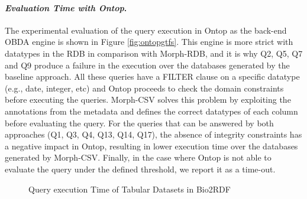 \noindent\paragraph*{\textit{Evaluation Time with Ontop}.}
The experimental evaluation of the query execution in Ontop as the back-end OBDA engine is shown in Figure \ref{fig:ontopgtfs}. This engine is more strict with datatypes in the RDB in comparison with Morph-RDB, and it is why Q2, Q5, Q7 and Q9 produce a failure in the execution over the databases generated by the baseline approach. All these queries have a FILTER clause on a specific datatype (e.g., date, integer, etc) and Ontop proceeds to check the domain constraints before executing the queries. Morph-CSV solves this problem by exploiting the annotations from the metadata and defines the correct datatypes of each column before evaluating the query. For the queries that can be answered by both approaches (Q1, Q3, Q4, Q13, Q14, Q17), the absence of integrity constraints has a negative impact in Ontop, resulting in lower execution time over the databases generated by Morph-CSV. Finally, in the case where Ontop is not able to evaluate the query under the defined threshold, we report it as a time-out.
\begin{figure}[t]
    \centering
    \caption[Query execution Time of Tabular Datasets in Bio2RDF]{Query execution Time of Tabular Datasets in Bio2RDF}
\end{figure}


